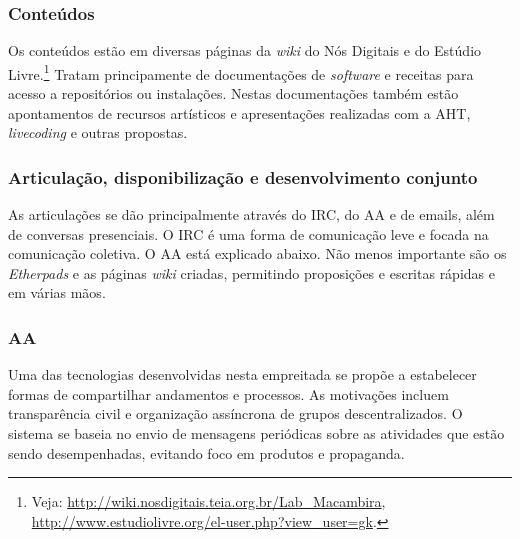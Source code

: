       \subsubsection{Conteúdos}

      Os conteúdos estão em diversas páginas da \emph{wiki} do Nós Digitais e do Estúdio Livre.\footnote{Veja: \url{http://wiki.nosdigitais.teia.org.br/Lab_Macambira}, \url{http://www.estudiolivre.org/el-user.php?view_user=gk}.} Tratam principamente de documentações de \emph{software} e receitas para acesso a repositórios ou instalações. Nestas documentações também estão apontamentos de recursos artísticos e apresentações realizadas com a AHT, \emph{livecoding} e outras propostas.

      \subsubsection{Articulação, disponibilização e desenvolvimento conjunto}

As articulações se dão principalmente através do IRC, do AA e de emails, além de conversas presenciais. O IRC é uma forma de comunicação leve e focada na comunicação coletiva. O AA está explicado abaixo. Não menos importante são os \emph{Etherpads} e as páginas \emph{wiki} criadas, permitindo proposições e escritas rápidas e em várias mãos.


\subsubsection{AA}

Uma das tecnologias desenvolvidas nesta empreitada se propõe a estabelecer formas de compartilhar andamentos e processos. As motivações incluem transparência civil e organização assíncrona de grupos descentralizados. O sistema se baseia no envio de mensagens periódicas sobre as atividades que estão sendo desempenhadas, evitando foco em produtos e propaganda.
